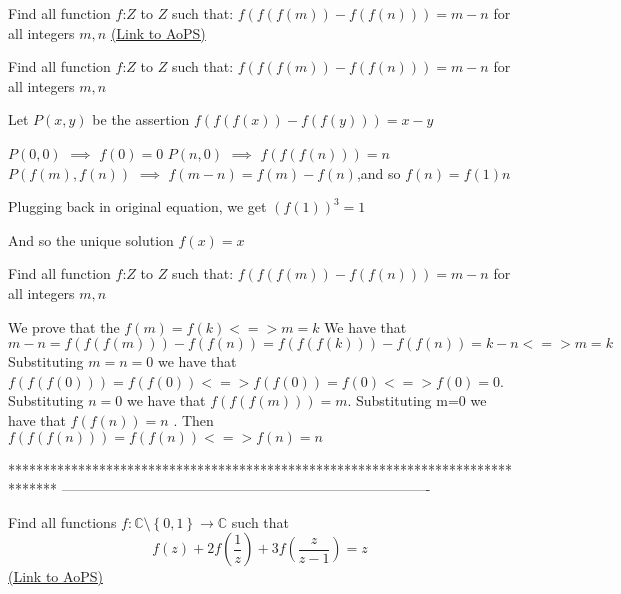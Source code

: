 \begin{problem}
	Find all function $f$:$Z$ to $Z$ such that:
$f(f(f(m))-f(f(n)))=m-n$ for all integers $m,n$
	\flushright \href{https://artofproblemsolving.com/community/c6h466988}{(Link to AoPS)}
\end{problem}



\begin{solution}
	\begin{tcolorbox}Find all function $f$:$Z$ to $Z$ such that:
$f(f(f(m))-f(f(n)))=m-n$ for all integers $m,n$\end{tcolorbox}
Let $P(x,y)$ be the assertion $f(f(f(x))-f(f(y)))=x-y$

$P(0,0)$ $\implies$ $f(0)=0$
$P(n,0)$ $\implies$ $f(f(f(n)))=n$
$P(f(m),f(n))$ $\implies$ $f(m-n)=f(m)-f(n)$,and so $f(n)=f(1)n$

Plugging back in original equation, we get $(f(1))^3=1$

And so the unique solution $\boxed{f(x)=x}$
\end{solution}



\begin{solution}
	\begin{tcolorbox}Find all function $f$:$Z$ to $Z$ such that:
$f(f(f(m))-f(f(n)))=m-n$ for all integers $m,n$\end{tcolorbox}
 We prove that the $ f(m)=f(k) <=> m=k $  We have that $ m-n=f(f(f(m)))-f(f(n))=f(f(f(k)))-f(f(n))=k-n <=> m=k $ 
 Substituting $ m=n=0 $ we have that $ f(f(f(0)))=f(f(0)) <=> f(f(0))=f(0) <=> f(0)=0 $. Substituting $ n=0 $ we have that $ f(f(f(m)))=m $. Substituting m=0 we have that $ f(f(n))=n $ . Then $ f(f(f(n)))=f(f(n)) <=> f(n)=n $
\end{solution}
*******************************************************************************
-------------------------------------------------------------------------------

\begin{problem}
	Find all functions $ f:\mathbb{C}\setminus \left \{ 0,1 \right \}\rightarrow \mathbb{C} $ such that\[f(z)+2f(\frac{1}{z})+3f(\frac{z}{z-1})=z\]
	\flushright \href{https://artofproblemsolving.com/community/c6h467160}{(Link to AoPS)}
\end{problem}



